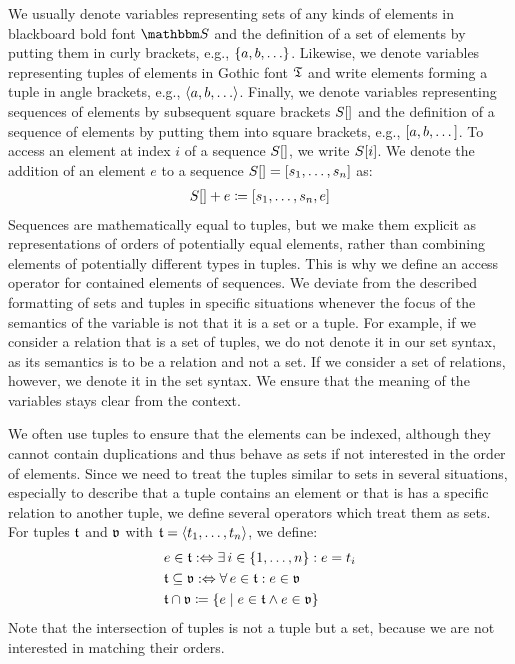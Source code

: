 We usually denote variables representing sets of any kinds of elements in blackboard bold font $\set{S}{}$ and the definition of a set of elements by putting them in curly brackets, e.g., $\setted{a, b, \dots}$.
Likewise, we denote variables representing tuples of elements in Gothic font $\mathfrak{T}{}$ and write elements forming a tuple in angle brackets, e.g., $\tupled{a, b, \dots}$.
Finally, we denote variables representing sequences of elements by subsequent square brackets $S[]$ and the definition of a sequence of elements by putting them into square brackets, e.g., $[a, b, \dots]$.
To access an element at index $i$ of a sequence $S[]$, we write $S[i]$.
We denote the addition of an element $e$ to a sequence $S[] = [s_1, \dots, s_n]$ as:
\begin{align*}
    S[] + e \coloneqq [s_1, \dots, s_n, e]
\end{align*}
Sequences are mathematically equal to tuples, but we make them explicit as representations of orders of potentially equal elements, rather than combining elements of potentially different types in tuples. This is why we define an access operator for contained elements of sequences.
We deviate from the described formatting of sets and tuples in specific situations whenever the focus of the semantics of the variable is not that it is a set or a tuple.
For example, if we consider a relation that is a set of tuples, we do not denote it in our set syntax, as its semantics is to be a relation and not a set.
If we consider a set of relations, however, we denote it in the set syntax.
We ensure that the meaning of the variables stays clear from the context.

We often use tuples to ensure that the elements can be indexed, although they cannot contain duplications and thus behave as sets if not interested in the order of elements.
Since we need to treat the tuples similar to sets in several situations, especially to describe that a tuple contains an element or that is has a specific relation to another tuple, we define several operators which treat them as sets.
For tuples $\mathfrak{t}$ and $\mathfrak{v}$ with $\mathfrak{t}{} = \langle t_1, \dots, t_n \rangle$, we define:
\begin{align*}
    &
    e \in \tuple{t}{} \equivalentperdefinition \exists i \in \setted{1, \dots, n} : e = t_i \\
    &
    \tuple{t} \subseteq \tuple{v} \equivalentperdefinition \forall e \in \tuple{t} : e \in \tuple{v} \\
    &
    \tuple{t} \cap \tuple{v} \equalsperdefinition \setted{e \mid e \in \tuple{t} \land e \in \tuple{v}}
\end{align*}
Note that the intersection of tuples is not a tuple but a set, because we are not interested in matching their orders.

